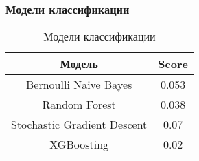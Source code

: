 \subsubsection{Модели классификации}

\begin{table}[H]
  \centering
  \begin{tabular} { | c | c | }
    \hline
    Модель & Score \\
    \hline
    Bernoulli Naive Bayes & 0.053 \\
    Random Forest & 0.038 \\
    Stochastic Gradient Descent & 0.07 \\
    XGBoosting & 0.02 \\
    \hline
  \end{tabular}
  \caption{Модели классификации}
\end{table}
